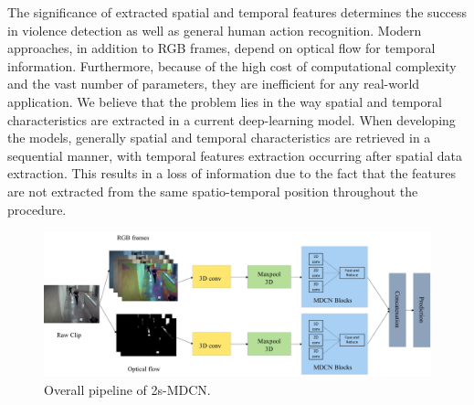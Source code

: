 The significance of extracted spatial and temporal features determines the success in violence detection as well as general human action recognition.
Modern approaches, in addition to RGB frames, depend on optical flow for temporal information. 
Furthermore, because of the high cost of computational complexity and the vast number of parameters, they are inefficient for any real-world application.
We believe that the problem lies in the way spatial and temporal characteristics are extracted in a current deep-learning model.
When developing the models, generally spatial and temporal characteristics are retrieved in a sequential manner, with temporal features extraction occurring after spatial data extraction. This results in a loss of information due to the fact that the features are not extracted from the same spatio-temporal position throughout the procedure.




	
	\begin{figure}[!htb]
	\centering
	\includegraphics[width=0.9\linewidth]{new_images/pipeline.pdf}
	\caption{Overall pipeline of 2s-MDCN.}
	\label{fig:pipeline}
	\end{figure}    

